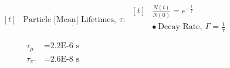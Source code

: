 \documentclass{article}
\begin{document}
\vspace{15pt}
\(
    \begin{aligned}[t]
        & \underline{ \text{Particle [Mean] Lifetimes},\ \tau }:\ 
            \begin{aligned}[t]
                & \boxed{ \tfrac{N(t)}{N(0)} = e^{-\tfrac{t}{\tau}} }\\
                & \bullet\ \text{Decay Rate},\ \Gamma = \tfrac{1}{\tau} \\
            \end{aligned}
            \\[-15pt]
        & \begin{aligned}
                \tau_\mu & = \text{2.2E-6 s}\\
                \tau_{\pi^-} & = \text{2.6E-8 s}\\
            \end{aligned}
            \\
    \end{aligned}
\)
\end{document}
